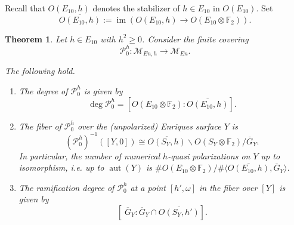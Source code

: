 \documentclass{amsart}
\theoremstyle{definition}
\theoremstyle{plain}
\newtheorem{theorem}[definition]{Theorem}
\DeclareMathOperator{\aut}{aut}
\DeclareMathOperator{\im}{im}
\newcommand{\FF}{\mathbb{F}}
\newcommand{\M}{\mathcal{M}}
\renewcommand{\P}{\mathcal{P}}
\newcommand{\Gbar}{\overline{G}}
\begin{document}
Recall that $O(E_{10},h)$ denotes the stabilizer of $h \in E_{10}$ in $O(E_{10})$.
Set \[\overline{O(E_{10},h)} := \im ( O(E_{10},h) \to O(E_{10}\otimes \FF_2)).\]
\begin{theorem}\label{thm:branch}
Let $h \in E_{10}$ with $h^2\geq 0$. Consider the finite covering
\[\P^h_0\colon \M_{En,h} \to \M_{En}.\]

The following hold.
\begin{enumerate}[leftmargin=*]
\item The degree of $\P^h_0$ is given by
\[\deg \P^h_0 = \left[O(E_{10}\otimes \FF_2) : \overline{O(E_{10},h)}\right].\]
\item The fiber of $\P^h_0$ over the (unpolarized) Enriques surface $Y$ is
\[\left(\P_0^h\right)^{-1}([Y,0]) \cong \overline{O(S_Y,h)} \backslash O(S_Y\otimes \FF_2) / \Gbar_Y  .\]
In particular, the number of numerical $h$-quasi polarizations on $Y$ up to isomorphism, i.e. up to $\aut(Y)$ is
$\# O(E_{10}\otimes \FF_2) / \# \langle  \overline{O(E_{10},h)}, \Gbar_Y\rangle$.
\item The ramification degree of $\P^h_0$ at a point $[h',\omega]$ in the fiber over $[Y]$ is given by
\[\left[\;\Gbar_Y: \Gbar_Y \cap \overline{O(S_Y, h')}\right].\]
\end{enumerate}
\end{theorem}
\end{document}
